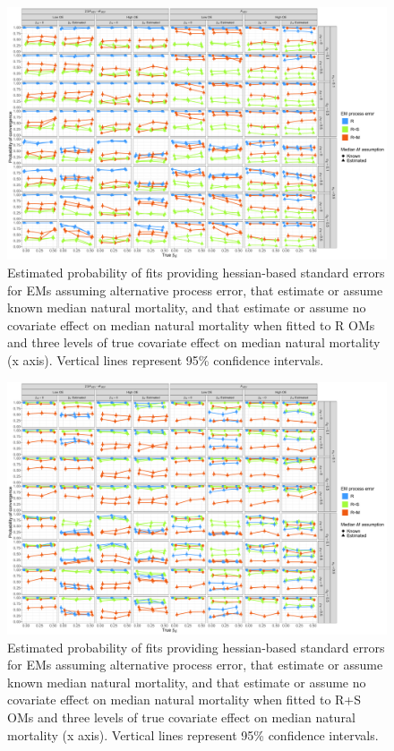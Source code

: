 \documentclass[
  12pt,
]{article}
\begin{document}
\begin{landscape}
\begin{figure}
\begin{center}
\includegraphics{convergence_Rom}
\end{center}
\caption{Estimated probability of fits providing hessian-based standard errors for EMs assuming alternative process error, that estimate or assume known median natural mortality, and that estimate or assume no covariate effect on median natural mortality when fitted to R OMs and three levels of true covariate effect on median natural mortality (x axis). Vertical lines represent 95\% confidence intervals.}\label{convergence_Rom}
\end{figure}
\end{landscape}

\begin{landscape}
\begin{figure}
\begin{center}
\includegraphics{convergence_RSom}
\end{center}
\caption{Estimated probability of fits providing hessian-based standard errors for EMs assuming alternative process error, that estimate or assume known median natural mortality, and that estimate or assume no covariate effect on median natural mortality when fitted to R+S OMs and three levels of true covariate effect on median natural mortality (x axis). Vertical lines represent 95\% confidence intervals.}\label{convergence_RSom}
\end{figure}
\end{landscape}
\end{document}
